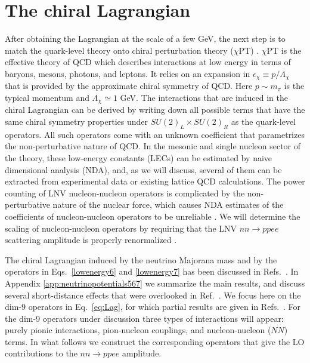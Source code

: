 \documentclass[letterpaper,11pt]{article}
\begin{document}
\section{The chiral Lagrangian}\label{ChiPT}
After obtaining the Lagrangian at the scale of a few GeV, the next step is to match the quark-level theory onto chiral perturbation theory ($\chi$PT) \cite{Gasser:1983yg,Bernard:1995dp}. $\chi$PT is the effective theory of QCD which describes interactions at low energy in terms of baryons, mesons, photons, and leptons. It relies on an expansion in $\epsilon_\chi\equiv p/\Lambda_\chi$ that is provided by the approximate chiral symmetry of QCD. Here 
$p\sim m_\pi$ is the typical momentum and $\Lambda_\chi\simeq 1$ GeV.
The interactions that are induced in the chiral Lagrangian can be derived by writing down all possible terms that have the same chiral symmetry properties under $SU(2)_L\times SU(2)_R$ as the quark-level operators. All such operators come with an unknown coefficient that parametrizes the non-perturbative nature of QCD.
In the mesonic and single nucleon sector of the theory,  these low-energy constants (LECs) can be estimated by naive dimensional analysis (NDA), 
and, as we will discuss, several of them can be extracted from  experimental data or existing lattice QCD calculations. 
The power counting of LNV nucleon-nucleon operators is complicated by the non-perturbative nature of the nuclear force, which causes NDA estimates of the coefficients of nucleon-nucleon operators to be unreliable \cite{Kaplan:1996xu,Nogga:2005hy, Valderrama:2014vra, Cirigliano:2018hja}. We will determine the scaling of nucleon-nucleon operators by requiring that the  LNV $nn\to pp ee$ scattering amplitude 
is properly renormalized \cite{Cirigliano:2018hja}.


The chiral Lagrangian induced by the neutrino Majorana mass and by the operators in Eqs.\ \eqref{lowenergy6} and \eqref{lowenergy7} has been discussed in Refs.\ \cite{Cirigliano:2017tvr,Cirigliano:2017djv,Cirigliano:2018hja}.
In Appendix \ref{app:neutrinopotentials567} we summarize the main results, and discuss several short-distance effects that were overlooked in Ref.\ \cite{Cirigliano:2017djv}.
We focus here on the dim-9 operators in Eq.\ \eqref{eq:Lag}, for which partial results are given in Refs.\ \cite{Prezeau:2003xn,Graesser:2016bpz}.
For the dim-9 operators under discussion three types of interactions will appear: purely pionic interactions, pion-nucleon couplings, and nucleon-nucleon ($N\!N$) terms. In what follows we construct the corresponding operators that give the LO contributions to the $nn\to pp ee$ amplitude.
\end{document}
